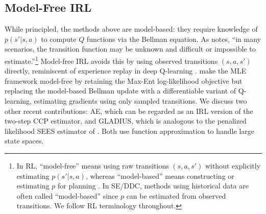 \subsection{Model-Free IRL}

While principled, the methods above are model-based: they require knowledge of $p(s'|s,a)$ to compute $Q$ functions via the Bellman equation. As \citet{adams:2022} notes, ``in many scenarios, the transition function may be unknown and difficult or impossible to estimate.''\footnote{\footnotesize In RL, ``model-free'' means using raw transitions $(s,a,s')$ without explicitly estimating $p(s'|s,a)$, whereas ``model-based'' means constructing or estimating $p$ for planning \citep{BartoSutton:2020}. In SE/DDC, methods using historical data are often called ``model-based'' since $p$ can be estimated from observed transitions. We follow RL terminology throughout.} Model-free IRL avoids this by using observed transitions $(s,a,s')$ directly, reminiscent of experience replay in deep Q-learning \citep{mnih:2015}. \citet{jain:2019} make the MLE framework model-free by retaining the Max-Ent log-likelihood objective but replacing the model-based Bellman update with a differentiable variant of Q-learning, estimating gradients using only sampled transitions. We discuss two other recent contributions: AE, which can be regarded as an IRL version of the two-step CCP estimator, and GLADIUS, which is analogous to the penalized likelihood SEES estimator of \citet{LuoSang:2024}. Both use function approximation to handle large state spaces.

